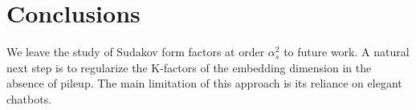 \section{Conclusions}\label{sec:conclusions}

We leave the study of Sudakov form factors at order $\alpha_s^2$ to
future work. A natural next step is to regularize the K-factors of the
embedding dimension in the absence of pileup. The main limitation of
this approach is its reliance on elegant chatbots.

